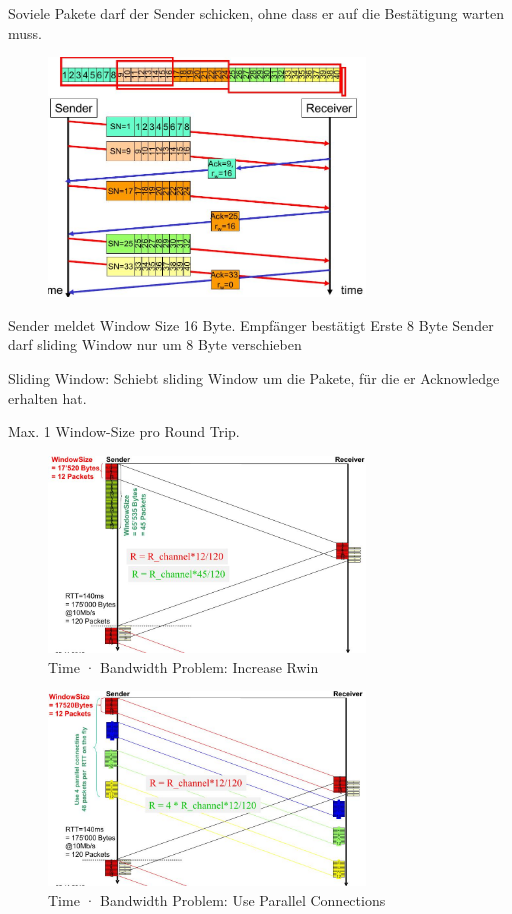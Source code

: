 \documentclass[ngerman,a4paper,12pt]{scrreprt}
\begin{document}
Soviele Pakete darf der Sender schicken, ohne dass er auf die Bestätigung warten muss.

\begin{figure}[H]
	\centering
	\includegraphics[width=0.75\textwidth]{img/V11.19.jpg}
	\caption{}
	\label{}
\end{figure}

\ol
	\li Sender meldet Window Size 16 Byte.
	\li Empfänger bestätigt Erste 8 Byte
	\li Sender darf sliding Window nur um 8 Byte verschieben
	\li 
\olE

Sliding Window: Schiebt sliding Window um die Pakete, für die er Acknowledge erhalten hat.

Max. 1 Window-Size pro Round Trip.
\begin{figure}[H]
	\centering
	\includegraphics[width=0.75\textwidth]{img/V11.20.jpg}
	\caption{Time · Bandwidth Problem:
Increase Rwin}
	\label{}
\end{figure}

\begin{figure}[H]
	\centering
	\includegraphics[width=0.75\textwidth]{img/V11.21.jpg}
	\caption{Time · Bandwidth Problem:
Use Parallel Connections
}
	\label{}
\end{figure}
\end{document}

